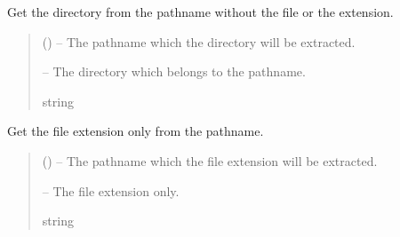 \documentclass[letterpaper,11pt,english]{sphinxmanual}
\begin{document}
\begin{savenotes}\begin{fulllineitems}
\label{\detokenize{code/opihiexarata.library.path:opihiexarata.library.path.get_directory}}
\pysigstartsignatures
{}
\pysigstopsignatures
\sphinxAtStartPar
Get the directory from the pathname without the file or the extension.
\begin{quote}\begin{description}
\sphinxAtStartPar
{} () – The pathname which the directory will be extracted.

\sphinxAtStartPar
{} – The directory which belongs to the pathname.

\sphinxAtStartPar
string

\end{description}\end{quote}

\end{fulllineitems}\end{savenotes}


\begin{savenotes}\begin{fulllineitems}
\label{\detokenize{code/opihiexarata.library.path:opihiexarata.library.path.get_file_extension}}
\pysigstartsignatures
{}
\pysigstopsignatures
\sphinxAtStartPar
Get the file extension only from the pathname.
\begin{quote}\begin{description}
\sphinxAtStartPar
{} () – The pathname which the file extension will be extracted.

\sphinxAtStartPar
{} – The file extension only.

\sphinxAtStartPar
string

\end{description}\end{quote}

\end{fulllineitems}\end{savenotes}
\end{document}
